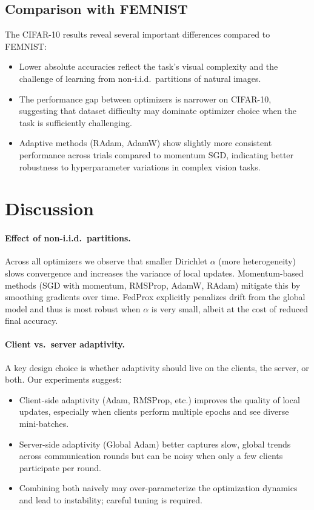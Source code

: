 \documentclass[10pt,twocolumn,letterpaper]{article}
\begin{document}
    \subsection{Comparison with FEMNIST}

    The CIFAR-10 results reveal several important differences compared to
    FEMNIST:
    \begin{itemize}
        \item Lower absolute accuracies reflect the task's visual complexity
        and the challenge of learning from non-i.i.d.\ partitions of natural
        images.
        \item The performance gap between optimizers is narrower on CIFAR-10,
        suggesting that dataset difficulty may dominate optimizer choice when
        the task is sufficiently challenging.
        \item Adaptive methods (RAdam, AdamW) show slightly more consistent
        performance across trials compared to momentum SGD, indicating better
        robustness to hyperparameter variations in complex vision tasks.
    \end{itemize}

    \section{Discussion}
    \label{sec:discussion}

    \paragraph{Effect of non-i.i.d.\ partitions.}
    Across all optimizers we observe that smaller Dirichlet $\alpha$ (more
    heterogeneity) slows convergence and increases the variance of local
    updates.
    Momentum-based methods (SGD with momentum, RMSProp, AdamW, RAdam)
    mitigate this by smoothing gradients over time.
    FedProx explicitly penalizes drift from the global model and thus is
    most robust when $\alpha$ is very small, albeit at the cost of reduced
    final accuracy.

    \paragraph{Client vs.\ server adaptivity.}
    A key design choice is whether adaptivity should live on the clients,
    the server, or both.
    Our experiments suggest:
    \begin{itemize}
        \item Client-side adaptivity (Adam, RMSProp, etc.) improves the
        quality of local updates, especially when clients perform multiple
        epochs and see diverse mini-batches.
        \item Server-side adaptivity (Global Adam) better captures slow,
        global trends across communication rounds but can be noisy when only
        a few clients participate per round.
        \item Combining both naively may over-parameterize the optimization
        dynamics and lead to instability; careful tuning is required.
    \end{itemize}
\end{document}
